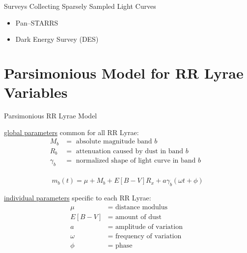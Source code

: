 \documentclass[12pt]{beamer}
\begin{document}
\begin{frame}{Surveys Collecting Sparsely Sampled Light Curves}
\begin{itemize}
\item Pan--STARRS
\item Dark Energy Survey (DES)
\end{itemize}
\end{frame}





\section{Parsimonious Model for RR Lyrae Variables}

\begin{frame}{Parsimonious RR Lyrae Model}

\underline{global parameters} common for all RR Lyrae:
{\footnotesize
\begin{align*}
M_b &=  \text{ absolute magnitude band $b$ }\\
R_b &= \text{ attenuation caused by dust in band $b$ }\\
\gamma_b &= \text{ normalized shape of light curve in band $b$ }\\
\end{align*}
}


\begin{equation*}
m_b(t) = \mu + M_b + E[B-V]R_x + a\gamma_b(\omega t + \phi)
\end{equation*}

\underline{individual parameters} specific to each RR Lyrae:
{\footnotesize
\begin{align*}
\mu &= \text{ distance modulus }\\
E[B-V] &= \text{ amount of dust }\\
a &= \text{ amplitude of variation }\\
\omega &= \text{ frequency of variation }\\
\phi &= \text{ phase }
\end{align*}
}

\end{frame}
\end{document}
